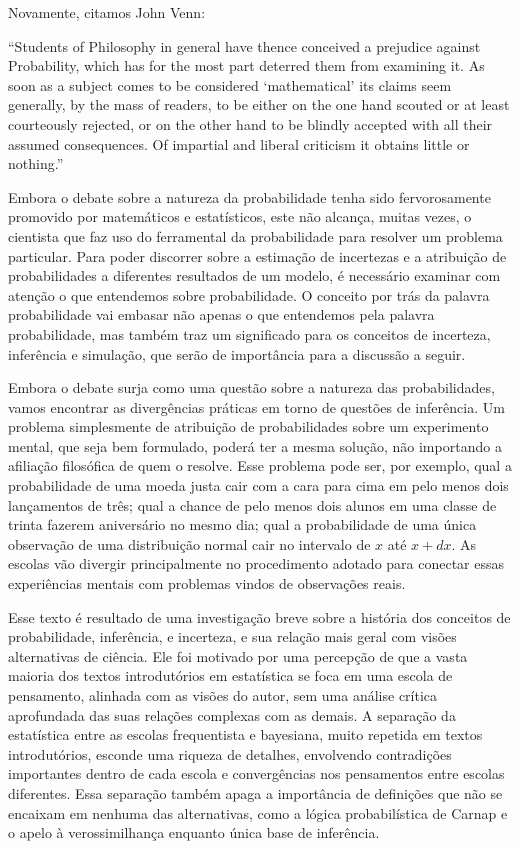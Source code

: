 Novamente, citamos John Venn:

``Students of Philosophy in general have thence conceived a prejudice against Probability, which has for the most part
deterred them from examining it. As soon as a subject comes to be considered `mathematical' its claims seem generally,
by the mass of readers, to be either on the one hand scouted or at least courteously rejected, or on the other hand
to be blindly accepted with all their assumed consequences. Of impartial and liberal criticism it obtains little or nothing.''
\cite{Venn1866}

Embora o debate sobre a natureza da probabilidade tenha sido fervorosamente promovido por matemáticos e estatísticos,
este não alcança, muitas vezes, o cientista que faz uso do ferramental da probabilidade para resolver um problema particular.
Para poder discorrer sobre a estimação de incertezas e a atribuição de probabilidades a diferentes resultados de um modelo,
é necessário examinar com atenção o que entendemos sobre probabilidade. O conceito por trás da palavra probabilidade vai
embasar não apenas o que entendemos pela palavra probabilidade, mas também traz um significado para os conceitos de
incerteza, inferência e simulação, que serão de importância para a discussão a seguir. 

Embora o debate surja como uma questão sobre a natureza das probabilidades, vamos encontrar as divergências práticas
em torno de questões de inferência. Um problema simplesmente de atribuição de probabilidades sobre um experimento mental,
que seja bem formulado, poderá ter a mesma solução, não importando a afiliação filosófica de quem o resolve. Esse problema 
pode ser, por exemplo, qual a probabilidade de uma moeda justa cair com a cara para cima em pelo menos dois lançamentos de 
três; qual a chance de pelo menos dois alunos em uma classe de trinta fazerem aniversário no mesmo dia; qual a probabilidade 
de uma única observação de uma distribuição normal cair no intervalo de $x$ até $x+dx$. As escolas vão divergir principalmente
no procedimento adotado para conectar essas experiências mentais com problemas vindos de observações reais. 

Esse texto é resultado de uma investigação breve sobre a história dos conceitos de probabilidade, inferência, e incerteza,
e sua relação mais geral com visões alternativas de ciência. Ele foi motivado por uma percepção de que a vasta maioria dos
textos introdutórios em estatística se foca em uma escola de pensamento, alinhada com as visões do autor, sem uma análise crítica
aprofundada das suas relações complexas com as demais. A separação da estatística entre as escolas frequentista e bayesiana,
muito repetida em textos introdutórios, esconde uma riqueza de detalhes, envolvendo contradições importantes dentro de cada
escola e convergências nos pensamentos entre escolas diferentes. Essa separação também apaga a importância de definições que
não se encaixam em nenhuma das alternativas, como a lógica probabilística de Carnap e o apelo à verossimilhança enquanto 
única base de inferência.

